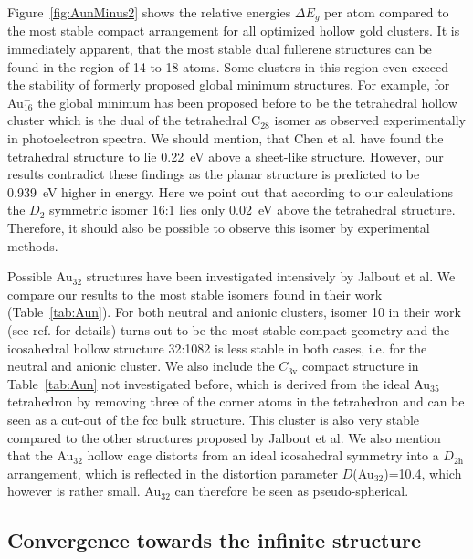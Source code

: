 Figure~\ref{fig:AunMinus2} shows the relative energies $\Delta E_g$ per atom
compared to the most stable compact arrangement for all optimized hollow gold
clusters.  It is immediately apparent, that the most stable dual fullerene
structures can be found in the region of 14 to 18 atoms. Some clusters in this
region even exceed the stability of formerly proposed global minimum
structures. For example, for Au$_{16}^-$ the global minimum has been proposed
before to be the tetrahedral hollow
cluster\autocite{Schooss_Determiningsizedependentstructure_2010,Lechtken_Structuredeterminationgold_2009}
which is the dual of the tetrahedral C$_{28}$ isomer as observed experimentally
in photoelectron spectra.\autocite{Bulusu_Evidencehollowgolden_2006} We should
mention, that Chen et al. have found the tetrahedral structure to lie 0.22~eV
above a sheet-like structure.\autocite{Chen_Structuresneutralanionic_2010}
However, our results contradict these findings as the planar structure is
predicted to be 0.939~eV higher in energy.  Here we point out that according to
our calculations the $D_\mathrm{2}$ symmetric isomer 16:1 lies only 0.02~eV above the
tetrahedral structure.  Therefore, it should also be possible to observe this
isomer by experimental methods.

Possible Au$_{32}$ structures have been investigated intensively by Jalbout et
al.\autocite{Jalbout_LowSymmetryStructuresAu_2008} We compare our results to
the most stable isomers found in their work (Table~\ref{tab:Aun}). For both
neutral and anionic clusters, isomer 10 in their work (see
ref. \cite{Jalbout_LowSymmetryStructuresAu_2008} for details) turns out to
be the most stable compact geometry and the icosahedral hollow structure
32:1082 is less stable in both cases, i.e. for the neutral and anionic cluster.
We also include the $C_\mathrm{3v}$ compact structure in Table~\ref{tab:Aun} not
investigated before, which is derived from the ideal Au$_{35}$ tetrahedron by
removing three of the corner atoms in the tetrahedron and can be seen as a
cut-out of the fcc bulk structure. This cluster is also very stable compared to
the other structures proposed by Jalbout et al. We also mention that the
Au$_{32}$ hollow cage distorts from an ideal icosahedral symmetry into a
$D_\mathrm{2h}$ arrangement, which is reflected in the distortion parameter
$D$(Au$_{32}$)=10.4, which however is rather small. Au$_{32}$ can therefore be
seen as pseudo-spherical.
  

\subsection{Convergence towards the infinite structure}

